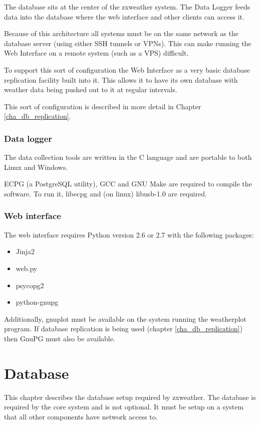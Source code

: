 \documentclass[a4paper,10pt,draft]{book}
\begin{document}
The database sits at the center of the zxweather system. The Data Logger feeds data into the database where the web interface and other clients can access it.

Because of this architecture all systems must be on the same network as the database server (using either SSH tunnels or VPNs). This can make running the Web Interface on a remote system (such as a VPS) difficult.

To support this sort of configuration the Web Interface as a very basic database replication facility built into it. This allows it to have its own database with weather data being pushed out to it at regular intervals.

This sort of configuration is described in more detail in Chapter \ref{cha_db_replication}.

\subsection{Data logger}
The data collection tools are written in the C language and are portable to both Linux and Windows.

ECPG (a PostgreSQL utility), GCC and GNU Make are required to compile the software. To run it, libecpg and (on linux) libusb-1.0 are required.

\subsection{Web interface}
The web interface requires Python version 2.6 or 2.7 with the following packages:
\begin{itemize}
\item Jinja2
\item web.py
\item psycopg2
\item python-gnupg
\end{itemize}

Additionally, gnuplot must be available on the system running the weatherplot program. If database replication is being used (chapter \ref{cha_db_replication}) then GnuPG must also be available.

\chapter{Database}
\label{cha_database}

This chapter describes the database setup required by zxweather. The database is required by the core system and is not optional. It must be setup on a system that all other components have network access to.
\end{document}
